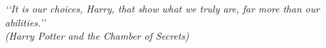 \begin{epigrafe}
    \vspace*{\fill}
	\begin{flushright}
		\textit{\lq\lq It is our choices, Harry, that show what we truly are, far more than our abilities.\rq\rq{} \\(Harry Potter and the Chamber of Secrets)}
	\end{flushright}
\end{epigrafe}
